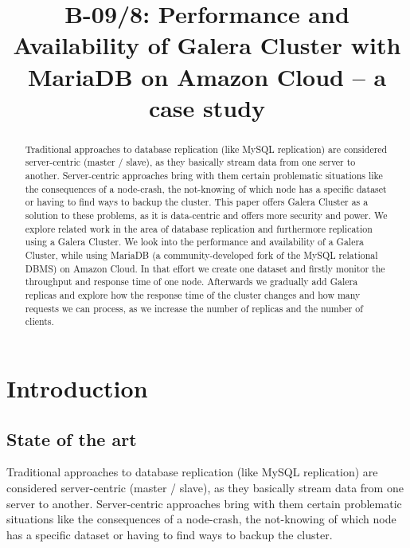 \documentclass{sig-alternate}
\begin{document}

\title{B-09/8: Performance and Availability of Galera Cluster with MariaDB on Amazon Cloud – a case study}



\maketitle
\begin{abstract}
	Traditional approaches to database replication (like MySQL replication) are considered server-centric (master / slave), as they basically stream data from one server to another. Server-centric approaches bring with them certain problematic situations like the consequences of a node-crash, the not-knowing of which node has a specific dataset or having to find ways to backup the cluster. This paper offers Galera Cluster as a solution to these problems, as it is data-centric and offers more security and power. We explore related work in the area of database replication and furthermore replication using a Galera Cluster. We look into the performance and availability of a Galera Cluster, while using MariaDB (a community-developed fork of the MySQL relational DBMS) on Amazon Cloud. In that effort we create one dataset and firstly monitor the throughput and response time of one node. Afterwards we gradually add Galera replicas and explore how the response time of the cluster changes and how many requests we can process, as we increase the number of replicas and the number of clients.
\end{abstract}


\section{Introduction}
\subsection{State of the art}
Traditional approaches to database replication (like MySQL replication) are considered server-centric (master / slave), as they basically stream data from one server to another. Server-centric approaches bring with them certain problematic situations like the consequences of a node-crash, the not-knowing of which node has a specific dataset or having to find ways to backup the cluster.
\end{document}
